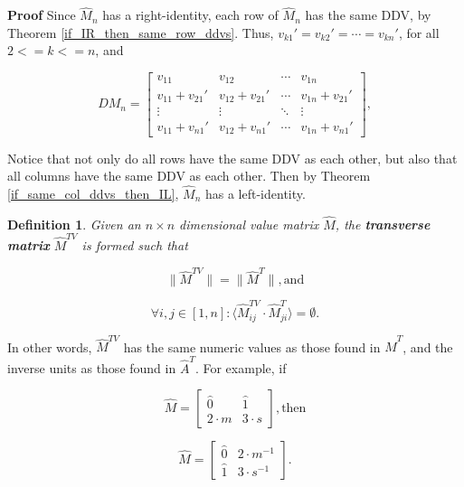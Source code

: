 \documentclass[10pt,letterpaper]{article}
\newtheorem{defn}{Definition}[section]
\newenvironment{proof}{\noindent\textbf{Proof} }{\qed \newline}
\newcommand{\qed}{\nobreak \ifvmode \relax \else
      \ifdim\lastskip<1.5em \hskip-\lastskip
      \hskip1.5em plus0em minus0.5em \fi \nobreak
      \vrule height0.75em width0.5em depth0.25em\fi}
\numberwithin{equation}{section}
\begin{document}
\begin{proof}
Since $\hat M_n$ has a right-identity, each row of $\hat M_n$ has
the same DDV, by Theorem \ref{if_IR_then_same_row_ddvs}.  Thus,
$v_{k1} \prime = v_{k2} \prime = \cdots = v_{kn} \prime$, for all $2 <= k <=
n$, and

\[ DM_n = \left[ \begin{matrix} 
  v_{11} & v_{12} & \cdots & v_{1n} \\
  v_{11} + v_{21} \prime & v_{12} + v_{21} \prime & \cdots & v_{1n} + v_{21} \prime \\
  \vdots & \vdots & \ddots & \vdots \\
  v_{11} + v_{n1} \prime & v_{12} + v_{n1} \prime & \cdots & v_{1n} + v_{n1} \prime
 \end{matrix} \right] , \]

Notice that not only do all rows have the same DDV as each other, but
also that all columns have the same DDV as each other.  Then by
Theorem \ref{if_same_col_ddvs_then_IL}, $\hat M_n$ has a
left-identity.\end{proof}

\begin{defn}Given an $n \times n$ dimensional value matrix $\hat M$,
  the \textbf{transverse matrix} $\hat M^{TV}$ is formed such that

\begin{equation}  \label{transverse_definition_part_1} \| \hat M^{TV} \| = \| \hat M^T \| , \mbox{and} \end{equation}

\begin{equation} \label{transverse_definition_part_2} \forall i,j \in [1, n] : \langle \hat M^{TV}_{ij} \cdot \hat M^T_{ji} \rangle = \emptyset . \end{equation} \end{defn}

In other words, $\hat M^{TV}$ has the same numeric values as those
found in $\hat M^T$, and the inverse units as those found in $\hat
A^T$.  For example, if

\[ \hat M = \left[ \begin{matrix}
 \hat 0 & \hat 1 \\
 2 \cdot m & 3 \cdot s
 \end{matrix} \right] , \mbox{then} \]

\[ \hat M = \left[ \begin{matrix}
 \hat 0 & 2 \cdot m^{-1} \\
 \hat 1 & 3 \cdot s^{-1}
 \end{matrix} \right] . \]
\end{document}
